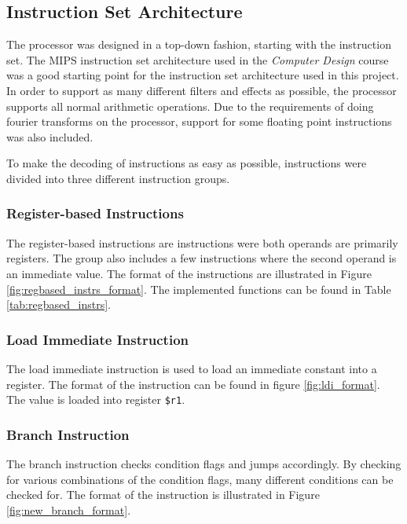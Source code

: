 \subsection{Instruction Set Architecture}\label{section:fpga-isa}

The processor was designed in a top-down fashion, starting with the instruction
set. The MIPS instruction set architecture used in the \textit{Computer
Design}\cite{tdt4255} course was a good starting point for the instruction set
architecture used in this project. In order to support as many different filters
and effects as possible, the processor supports all normal arithmetic
operations. Due to the requirements of doing fourier transforms on the
processor, support for some floating point instructions was also included.

To make the decoding of instructions as easy as possible, instructions
were divided into three different instruction groups.

\subsubsection{Register-based Instructions}

The register-based instructions are instructions were both operands are
primarily registers. The group also includes a few instructions where
the second operand is an immediate value. The format of the
instructions are illustrated in Figure \ref{fig:regbased_instrs_format}. The
implemented functions can be found in Table \ref{tab:regbased_instrs}.


\FloatBarrier

\FloatBarrier

\subsubsection{Load Immediate Instruction}
The load immediate instruction is used to load an immediate constant into a
register. The format of the instruction can be found in figure
\ref{fig:ldi_format}. The value is loaded into register \texttt{\$r1}.


\FloatBarrier

\subsubsection{Branch Instruction}
The branch instruction checks condition flags and jumps accordingly. By
checking for various combinations of the condition flags, many different
conditions can be checked for. The format of the instruction is illustrated
in Figure \ref{fig:new_branch_format}.

